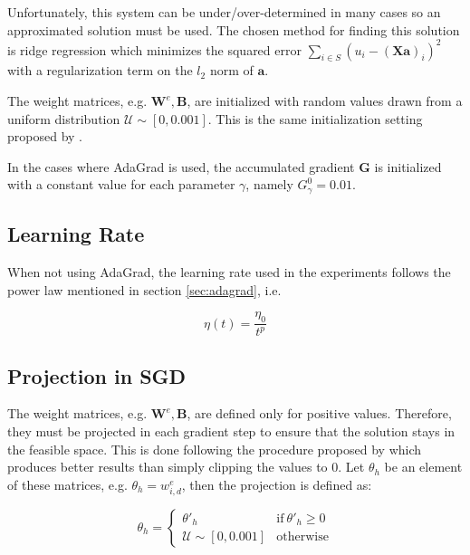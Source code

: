Unfortunately, this system can be under/over-determined in many cases so an approximated solution must be used. The chosen method for finding this solution is ridge regression which minimizes the squared error $\sum_{i \in S}(u_{i} - (\mathbf{X}\mathbf{a})_{i})^{2}$ with a regularization term on the $l_{2}$ norm of $\mathbf{a}$.

The weight matrices, e.g. $\mathbf{W}^{e}, \mathbf{B}$, are initialized with random values drawn from a uniform distribution $\mathcal{U} \sim [0, 0.001]$. This is the same initialization setting proposed by \citet{tschiatschek16learning}.

In the cases where AdaGrad is used, the accumulated gradient $\mathbf{G}$ is initialized with a constant value for each parameter $\gamma$, namely $G^{0}_{\gamma} = 0.01$.

\subsection{Learning Rate}

When not using AdaGrad, the learning rate used in the experiments follows the power law mentioned in section \ref{sec:adagrad}, i.e.

\begin{equation}
  \eta(t) = \frac{\eta_{0}}{t^{p}}
\end{equation}

\subsection{Projection in SGD}

The weight matrices, e.g. $\mathbf{W}^{e}, \mathbf{B}$, are defined only for positive values. Therefore, they must be projected in each gradient step to ensure that the solution stays in the feasible space. This is done following the procedure proposed by \citet{tschiatschek16learning} which produces better results than simply clipping the values to 0. Let $\theta_{h}$ be an element of these matrices, e.g. $\theta_{h} = w^{e}_{i,d}$, then the projection is defined as:

\begin{equation}
  \theta_{h} = \begin{cases}
    \theta'_{h} & \text{if}\ \theta'_{h} \geq 0 \\
    \mathcal{U} \sim [0, 0.001] & \text{otherwise}
  \end{cases}
\end{equation}

